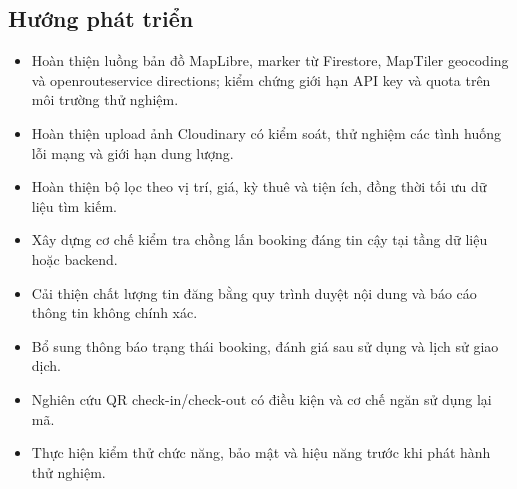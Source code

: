 \subsection{Hướng phát triển}
\begin{itemize}
\item Hoàn thiện luồng bản đồ MapLibre, marker từ Firestore, MapTiler geocoding và openrouteservice directions; kiểm chứng giới hạn API key và quota trên môi trường thử nghiệm.
\item Hoàn thiện upload ảnh Cloudinary có kiểm soát, thử nghiệm các tình huống lỗi mạng và giới hạn dung lượng.
\item Hoàn thiện bộ lọc theo vị trí, giá, kỳ thuê và tiện ích, đồng thời tối ưu dữ liệu tìm kiếm.
\item Xây dựng cơ chế kiểm tra chồng lấn booking đáng tin cậy tại tầng dữ liệu hoặc backend.
\item Cải thiện chất lượng tin đăng bằng quy trình duyệt nội dung và báo cáo thông tin không chính xác.
\item Bổ sung thông báo trạng thái booking, đánh giá sau sử dụng và lịch sử giao dịch.
\item Nghiên cứu QR check-in/check-out có điều kiện và cơ chế ngăn sử dụng lại mã.
\item Thực hiện kiểm thử chức năng, bảo mật và hiệu năng trước khi phát hành thử nghiệm.
\end{itemize}
